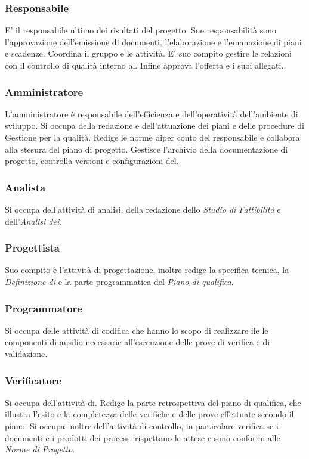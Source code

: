 \subsubsection{Responsabile}E' il responsabile ultimo dei risultati del progetto. Sue responsabilità sono l'approvazione dell'emissione di documenti, l'elaborazione e l'emanazione di piani e scadenze. Coordina il gruppo e le attività. E' suo compito gestire le relazioni con il controllo di qualità interno al. Infine approva l'offerta e i suoi allegati.
\subsubsection{Amministratore} L'amministratore è responsabile dell'efficienza e dell'operatività dell'ambiente di sviluppo. Si occupa della redazione e dell'attuazione dei piani e delle procedure di Gestione per la qualità. Redige le norme diper conto del responsabile e collabora alla stesura del piano di progetto. Gestisce l'archivio della documentazione di progetto, controlla versioni e configurazioni del.
\subsubsection{Analista} Si occupa dell'attività di analisi, della redazione dello \textit{Studio di Fattibilità} e dell'\textit{Analisi dei}.
\subsubsection{Progettista} Suo compito è l'attività di progettazione, inoltre redige la specifica tecnica, la \textit{Definizione di} e la parte programmatica del \textit{Piano di qualifica}. 
\subsubsection{Programmatore} Si occupa delle attività di codifica che hanno lo scopo di realizzare ile le componenti di ausilio necessarie all'esecuzione delle prove di verifica e di validazione.
\subsubsection{Verificatore} Si occupa dell'attività di. Redige la parte retrospettiva del piano di qualifica, che illustra l'esito e la completezza delle verifiche e delle prove effettuate secondo il piano. Si occupa  inoltre dell'attività di controllo, in particolare verifica se i documenti e i prodotti dei processi rispettano le attese e sono conformi alle \textit{Norme di Progetto}. 

